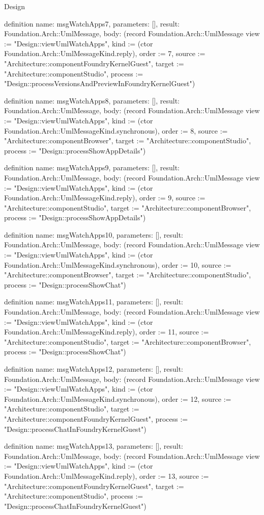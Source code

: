 \begin{lexlean}{Design}
\begin{semanticmodule}
definition{
  name: msgWatchApps7,
  parameters: [],
  result: Foundation.Arch::UmlMessage,
  body: (record Foundation.Arch::UmlMessage {view := "Design::viewUmlWatchApps", kind := (ctor Foundation.Arch::UmlMessageKind.reply), order := 7, source := "Architecture::componentFoundryKernelGuest", target := "Architecture::componentStudio", process := "Design::processVersionsAndPreviewInFoundryKernelGuest"})
}

definition{
  name: msgWatchApps8,
  parameters: [],
  result: Foundation.Arch::UmlMessage,
  body: (record Foundation.Arch::UmlMessage {view := "Design::viewUmlWatchApps", kind := (ctor Foundation.Arch::UmlMessageKind.synchronous), order := 8, source := "Architecture::componentBrowser", target := "Architecture::componentStudio", process := "Design::processShowAppDetails"})
}

definition{
  name: msgWatchApps9,
  parameters: [],
  result: Foundation.Arch::UmlMessage,
  body: (record Foundation.Arch::UmlMessage {view := "Design::viewUmlWatchApps", kind := (ctor Foundation.Arch::UmlMessageKind.reply), order := 9, source := "Architecture::componentStudio", target := "Architecture::componentBrowser", process := "Design::processShowAppDetails"})
}

definition{
  name: msgWatchApps10,
  parameters: [],
  result: Foundation.Arch::UmlMessage,
  body: (record Foundation.Arch::UmlMessage {view := "Design::viewUmlWatchApps", kind := (ctor Foundation.Arch::UmlMessageKind.synchronous), order := 10, source := "Architecture::componentBrowser", target := "Architecture::componentStudio", process := "Design::processShowChat"})
}

definition{
  name: msgWatchApps11,
  parameters: [],
  result: Foundation.Arch::UmlMessage,
  body: (record Foundation.Arch::UmlMessage {view := "Design::viewUmlWatchApps", kind := (ctor Foundation.Arch::UmlMessageKind.reply), order := 11, source := "Architecture::componentStudio", target := "Architecture::componentBrowser", process := "Design::processShowChat"})
}

definition{
  name: msgWatchApps12,
  parameters: [],
  result: Foundation.Arch::UmlMessage,
  body: (record Foundation.Arch::UmlMessage {view := "Design::viewUmlWatchApps", kind := (ctor Foundation.Arch::UmlMessageKind.synchronous), order := 12, source := "Architecture::componentStudio", target := "Architecture::componentFoundryKernelGuest", process := "Design::processChatInFoundryKernelGuest"})
}

definition{
  name: msgWatchApps13,
  parameters: [],
  result: Foundation.Arch::UmlMessage,
  body: (record Foundation.Arch::UmlMessage {view := "Design::viewUmlWatchApps", kind := (ctor Foundation.Arch::UmlMessageKind.reply), order := 13, source := "Architecture::componentFoundryKernelGuest", target := "Architecture::componentStudio", process := "Design::processChatInFoundryKernelGuest"})
}


\end{semanticmodule}
\end{lexlean}
